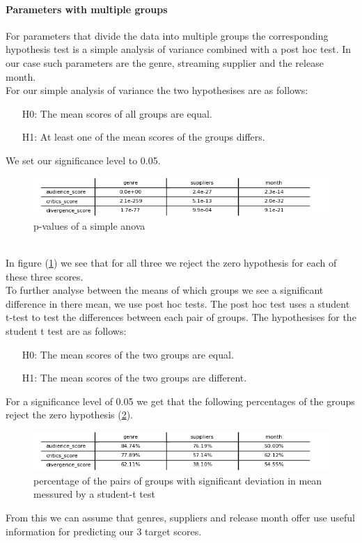 \documentclass{article}
\begin{document}
    \paragraph{Parameters with multiple groups}
    For parameters that divide the data into multiple groups the corresponding hypothesis test is a simple analysis of variance combined with a post hoc test. In our case such parameters are the genre, streaming supplier and the release month.\\
    For our simple analysis of variance the two hypothesises are as follows:
    \begin{enumerate}
        \item[H0:] The mean scores of all groups are equal.
        \item[H1:] At least one of the mean scores of the groups differs.
    \end{enumerate}
    We set our significance level to 0.05.\\
    \noindent
    \begin{figure}[h]
        \centering
        \includegraphics[width=1\textwidth]{imgs/var_p.png}
        \caption{p-values of a simple anova}
        \label{fig:variance_p}
    \end{figure}\\
    In figure (\ref{fig:variance_p}) we see that for all three we reject the zero hypothesis for each of these three scores.\\
    To further analyse between the means of which groups we see a significant difference in there mean, we use post hoc tests. The post hoc test uses a student t-test to test the differences between each pair of groups. The hypothesises for the student t test are as follows:
    \begin{enumerate}
        \item[H0:] The mean scores of the two groups are equal.
        \item[H1:] The mean scores of the two groups are different.
    \end{enumerate}
    For a significance level of 0.05 we get that the following percentages of the groups reject the zero hypothesis (\ref{fig:hypo_rejection}).
    \noindent
    \begin{figure}[t]
        \centering
        \includegraphics[width=1\textwidth]{imgs/prozent.png}
        \caption{percentage of the pairs of groups with significant deviation in mean messured by a student-t test}
        \label{fig:hypo_rejection}
    \end{figure}
    From this we can assume that genres, suppliers and release month offer use useful information for predicting our 3 target scores.
\end{document}
